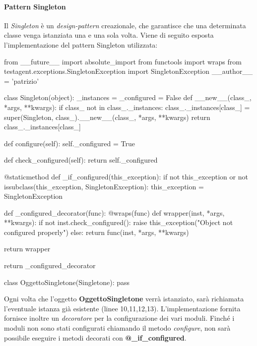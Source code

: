\documentclass[../main.tex]{subfiles}
\begin{document}
\paragraph{Pattern Singleton}
Il \textit{Singleton} è un \textit{design-pattern} creazionale, che garantisce che una determinata classe venga istanziata una e una sola volta.
Viene di seguito esposta l'implementazione del pattern Singleton utilizzata:
\begin{python}
from __future__ import absolute_import
from functools import wraps
from testagent.exceptions.SingletonException import SingletonException
__author__ = 'patrizio'


class Singleton(object):
    _instances = {}
    _configured = False
    def __new__(class_, *args, **kwargs):
        if class_ not in class_._instances:
            class_._instances[class_] = super(Singleton, class_).__new__(class_, *args, **kwargs)
        return class_._instances[class_]

    def configure(self):
        self._configured = True

    def check_configured(self):
        return self._configured

    @staticmethod
    def _if_configured(this_exception):
        if not this_exception or not issubclass(this_exception, SingletonException):
            this_exception = SingletonException

        def _configured_decorator(func):
            @wraps(func)
            def wrapper(inst, *args, **kwargs):
                if not inst.check_configured():
                    raise this_exception("Object not configured properly")
                else:
                    return func(inst, *args, **kwargs)

            return wrapper

        return _configured_decorator
        
class OggettoSingletone(Singletone):
    pass
\end{python}
Ogni volta che l'oggetto \textbf{OggettoSingletone} verrà istanziato, sarà richiamata l'eventuale istanza già esistente (linee 10,11,12,13).
L'implementazione fornita fornisce inoltre un \textit{decoratore} per la configurazione dei vari moduli. Finché i moduli non sono stati configurati chiamando il metodo \textit{configure}, non sarà possibile eseguire i metodi decorati con \textbf{@\_if\_configured}.
\newpage
\end{document}
